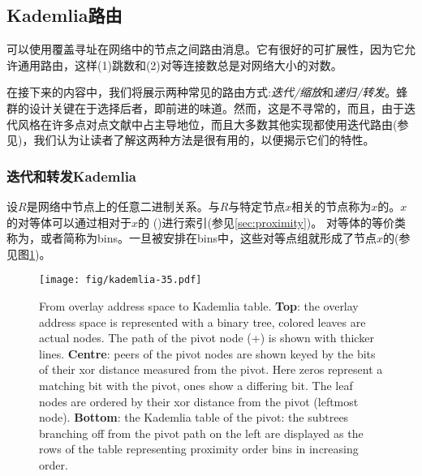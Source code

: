 \subsection{Kademlia路由\statusgreen}\label{sec:kademlia-routing}

可以使用覆盖寻址在网络中的节点之间路由消息。它有很好的可扩展性，因为它允许通用路由，这样(1)跳数和(2)对等连接数总是对网络大小的对数。 

在接下来的内容中，我们将展示两种常见的路由方式:\emph{迭代/缩放}和\emph{递归/转发}。蜂群的设计关键在于选择后者，即前进的味道。然而，这是不寻常的，而且，由于迭代风格在许多点对点文献中占主导地位，而且大多数其他实现都使用迭代路由(参见\cite{maymounkov2002kademlia,baumgart2007s,lua2005survey})，我们认为让读者了解这两种方法是很有用的，以便揭示它们的特性。

\subsubsection{迭代和转发Kademlia}

设$R$是网络中节点上的任意二进制关系。与$R$与特定节点$x$相关的节点称为$x$的。$x$的对等体可以通过相对于$x$的 ()进行索引(参见\ref{sec:proximity})。
对等体的等价类称为，或者简称为bins。一旦被安排在bins中，这些对等点组就形成了节点$x$的(参见图\ref{fig:kademlia-table})。 



\begin{figure}[htbp]
   \centering
    \texttt{[image: fig/kademlia-35.pdf]}
   \caption[From overlay address space to Kademlia table \statusgreen]{From overlay address space to Kademlia table. \textbf{Top}: the overlay address space is represented with a binary tree, colored leaves are actual nodes. The path of the pivot node (+) is shown with thicker lines. \textbf{Centre}: peers of the pivot nodes are shown keyed by the bits of their xor distance measured from the pivot. Here zeros represent a matching bit with the pivot, ones show a differing bit. The leaf nodes are ordered by their xor distance from the pivot (leftmost node). \textbf{Bottom}: the Kademlia table of the pivot: the subtrees branching off from the pivot path on the left are displayed as the rows of the table representing proximity order bins in increasing order.}
   \label{fig:kademlia-table}
\end{figure}

